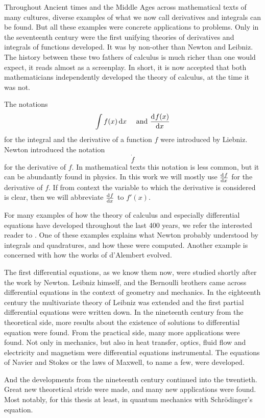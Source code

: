 Throughout Ancient times and the Middle Ages across mathematical texts of many cultures, diverse examples of what we now call derivatives and integrals can be found. But all these examples were concrete applications to problems. Only in the seventeenth century were the first unifying theories of derivatives and integrals of functions developed. It was by non-other than Newton and Leibniz. The history between these two fathers of calculus is much richer than one would expect, it reads almost as a screenplay. In short, it is now accepted that both mathematicians independently developed the theory of calculus, at the time it was not.

The notations
$$
    \int f(x) \, \dd x \quad \text{ and } \dv[]{f(x)}{x}
$$
for the integral and the derivative of a function $f$ were introduced by Liebniz. Newton introduced the notation
$$
    \dot{f}
$$
for the derivative of $f$. In mathematical texts this notation is less common, but it can be abundantly found in physics. In this work we will mostly use $\dv[]{f}{x}$ for the derivative of $f$. If from context the variable to which the derivative is considered is clear, then we will abbreviate $\dv[]{f}{x}$ to $f'(x)$.

For many examples of how the theory of calculus and especially differential equations have developed throughout the last 400 years, we refer the interested reader to \cite{archibald_history_2005}. One of these examples explains what Newton probably understood by integrals and quadratures, and how these were computed. Another example is concerned with how the works of d'Alembert evolved.

The first differential equations, as we know them now, were studied shortly after the work by Newton. Leibniz himself, and the Bernoulli brothers came across differential equations in the context of geometry and mechanics. In the eighteenth century the multivariate theory of Leibniz was extended and the first partial differential equations were written down. In the nineteenth century from the theoretical side, more results about the existence of solutions to differential equation were found. From the practical side, many more applications were found. Not only in mechanics, but also in heat transfer, optics, fluid flow and electricity and magnetism were differential equations instrumental. The equations of Navier and Stokes or the laws of Maxwell, to name a few, were developed.

And the developments from the nineteenth century continued into the twentieth. Great new theoretical stride were made, and many new applications were found. Most notably, for this thesis at least, in quantum mechanics with Schrödinger's equation.

